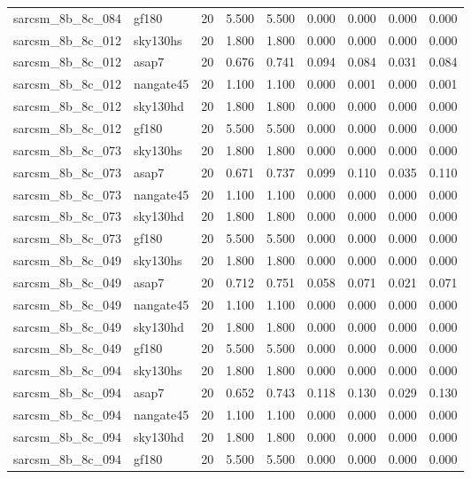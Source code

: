 \begin{tabular}{llrrrrrrr}
sarcsm\_8b\_8c\_084 & gf180 & 20 & 5.500 & 5.500 & 0.000 & 0.000 & 0.000 & 0.000 \\
sarcsm\_8b\_8c\_012 & sky130hs & 20 & 1.800 & 1.800 & 0.000 & 0.000 & 0.000 & 0.000 \\
sarcsm\_8b\_8c\_012 & asap7 & 20 & 0.676 & 0.741 & 0.094 & 0.084 & 0.031 & 0.084 \\
sarcsm\_8b\_8c\_012 & nangate45 & 20 & 1.100 & 1.100 & 0.000 & 0.001 & 0.000 & 0.001 \\
sarcsm\_8b\_8c\_012 & sky130hd & 20 & 1.800 & 1.800 & 0.000 & 0.000 & 0.000 & 0.000 \\
sarcsm\_8b\_8c\_012 & gf180 & 20 & 5.500 & 5.500 & 0.000 & 0.000 & 0.000 & 0.000 \\
sarcsm\_8b\_8c\_073 & sky130hs & 20 & 1.800 & 1.800 & 0.000 & 0.000 & 0.000 & 0.000 \\
sarcsm\_8b\_8c\_073 & asap7 & 20 & 0.671 & 0.737 & 0.099 & 0.110 & 0.035 & 0.110 \\
sarcsm\_8b\_8c\_073 & nangate45 & 20 & 1.100 & 1.100 & 0.000 & 0.000 & 0.000 & 0.000 \\
sarcsm\_8b\_8c\_073 & sky130hd & 20 & 1.800 & 1.800 & 0.000 & 0.000 & 0.000 & 0.000 \\
sarcsm\_8b\_8c\_073 & gf180 & 20 & 5.500 & 5.500 & 0.000 & 0.000 & 0.000 & 0.000 \\
sarcsm\_8b\_8c\_049 & sky130hs & 20 & 1.800 & 1.800 & 0.000 & 0.000 & 0.000 & 0.000 \\
sarcsm\_8b\_8c\_049 & asap7 & 20 & 0.712 & 0.751 & 0.058 & 0.071 & 0.021 & 0.071 \\
sarcsm\_8b\_8c\_049 & nangate45 & 20 & 1.100 & 1.100 & 0.000 & 0.000 & 0.000 & 0.000 \\
sarcsm\_8b\_8c\_049 & sky130hd & 20 & 1.800 & 1.800 & 0.000 & 0.000 & 0.000 & 0.000 \\
sarcsm\_8b\_8c\_049 & gf180 & 20 & 5.500 & 5.500 & 0.000 & 0.000 & 0.000 & 0.000 \\
sarcsm\_8b\_8c\_094 & sky130hs & 20 & 1.800 & 1.800 & 0.000 & 0.000 & 0.000 & 0.000 \\
sarcsm\_8b\_8c\_094 & asap7 & 20 & 0.652 & 0.743 & 0.118 & 0.130 & 0.029 & 0.130 \\
sarcsm\_8b\_8c\_094 & nangate45 & 20 & 1.100 & 1.100 & 0.000 & 0.000 & 0.000 & 0.000 \\
sarcsm\_8b\_8c\_094 & sky130hd & 20 & 1.800 & 1.800 & 0.000 & 0.000 & 0.000 & 0.000 \\
sarcsm\_8b\_8c\_094 & gf180 & 20 & 5.500 & 5.500 & 0.000 & 0.000 & 0.000 & 0.000 \\

\end{tabular}

